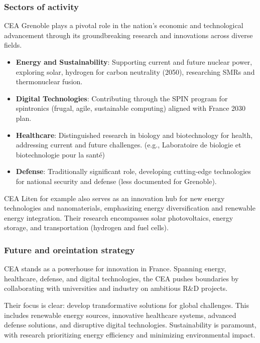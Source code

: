 \subsubsection{Sectors of activity}

CEA Grenoble plays a pivotal role in the nation's economic and technological 
advancement through its groundbreaking research and innovations across diverse fields.

\begin{itemize}
  \item \textbf{Energy and Sustainability}: Supporting current and future nuclear power, exploring solar, hydrogen for carbon
   neutrality (2050), researching SMRs and thermonuclear fusion.
  \item \textbf{Digital Technologies}: Contributing through the SPIN program for spintronics (frugal, agile, sustainable computing)
   aligned with France 2030 plan.
  \item \textbf{Healthcare}: Distinguished research in biology and biotechnology for health, addressing current and future challenges.
   (e.g., Laboratoire de biologie et biotechnologie pour la santé)
  \item \textbf{Defense}: Traditionally significant role, developing cutting-edge technologies for national security and defense 
  (less documented for Grenoble).
\end{itemize}

CEA Liten for example also serves as an innovation hub for new energy technologies and nanomaterials, emphasizing energy diversification
 and renewable energy integration. Their research encompasses solar photovoltaics, energy storage, and transportation (hydrogen and fuel
  cells).


\subsubsection{Future and oreintation strategy}

\medskip

 CEA stands as a powerhouse for innovation in France.
  Spanning energy, healthcare, defense, and digital technologies, the CEA pushes boundaries by collaborating with universities
  and industry on ambitious R\&D projects.

\medskip

Their focus is clear: develop transformative solutions for global challenges. 
 This includes renewable energy sources, innovative healthcare systems, advanced defense solutions, 
 and disruptive digital technologies.  Sustainability is paramount, with research prioritizing energy 
 efficiency and minimizing environmental impact.

